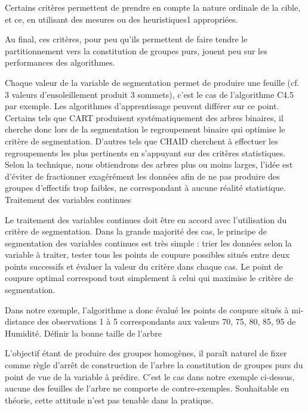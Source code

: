 Certains critères permettent de prendre en compte la nature ordinale de la cible, et ce, en utilisant des mesures ou des heuristiques1 appropriées.

Au final, ces critères, pour peu qu’ils permettent de faire tendre le partitionnement vers la constitution de groupes purs, jouent peu sur les performances des algorithmes.

Chaque valeur de la variable de segmentation permet de produire une feuille (cf. 3 valeurs d’ensoleillement produit 3 sommets), c’est le cas de l’algorithme C4.5 par exemple. Les algorithmes d’apprentissage peuvent différer sur ce point. Certains tels que CART produisent systématiquement des arbres binaires, il cherche donc lors de la segmentation le regroupement binaire qui optimise le critère de segmentation. D’autres tels que CHAID cherchent à effectuer les regroupements les plus pertinents en s’appuyant sur des critères statistiques. Selon la technique, nous obtiendrons des arbres plus ou moins larges, l’idée est d’éviter de fractionner exagérément les données afin de ne pas produire des groupes d’effectifs trop faibles, ne correspondant à aucune réalité statistique.
Traitement des variables continues

Le traitement des variables continues doit être en accord avec l’utilisation du critère de segmentation. Dans la grande majorité des cas, le principe de segmentation des variables continues est très simple : trier les données selon la variable à traiter, tester tous les points de coupure possibles situés entre deux points successifs et évaluer la valeur du critère dans chaque cas. Le point de coupure optimal correspond tout simplement à celui qui maximise le critère de segmentation.

Dans notre exemple, l’algorithme a donc évalué les points de coupure situés à mi-distance des observations 1 à 5 correspondants aux valeurs {70, 75, 80, 85, 95} de Humidité.
Définir la bonne taille de l’arbre

L’objectif étant de produire des groupes homogènes, il paraît naturel de fixer comme règle d’arrêt de construction de l’arbre la constitution de groupes purs du point de vue de la variable à prédire. C’est le cas dans notre exemple ci-dessus, aucune des feuilles de l’arbre ne comporte de contre-exemples. Souhaitable en théorie, cette attitude n’est pas tenable dans la pratique.

